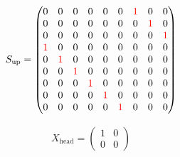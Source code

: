 \begin{align}
  S_{\text{up}} =
  \begin{pmatrix}
    0                  & 0                  & 0                  & 0                  & 0                  & 0                  & \textcolor{red}{1} & 0                  & 0                  \\
    0                  & 0                  & 0                  & 0                  & 0                  & 0                  & 0                  & \textcolor{red}{1} & 0                  \\
    0                  & 0                  & 0                  & 0                  & 0                  & 0                  & 0                  & 0                  & \textcolor{red}{1} \\
    \textcolor{red}{1} & 0                  & 0                  & 0                  & 0                  & 0                  & 0                  & 0                  & 0                  \\
    0                  & \textcolor{red}{1} & 0                  & 0                  & 0                  & 0                  & 0                  & 0                  & 0                  \\
    0                  & 0                  & \textcolor{red}{1} & 0                  & 0                  & 0                  & 0                  & 0                  & 0                  \\
    0                  & 0                  & 0                  & \textcolor{red}{1} & 0                  & 0                  & 0                  & 0                  & 0                  \\
    0                  & 0                  & 0                  & 0                  & \textcolor{red}{1} & 0                  & 0                  & 0                  & 0                  \\
    0                  & 0                  & 0                  & 0                  & 0                  & \textcolor{red}{1} & 0                  & 0                  & 0
  \end{pmatrix}
\end{align}

\begin{align}
  X_{\text{head}} =
  \begin{pmatrix}
    1 & 0 \\
    0 & 0
  \end{pmatrix}
\end{align}


